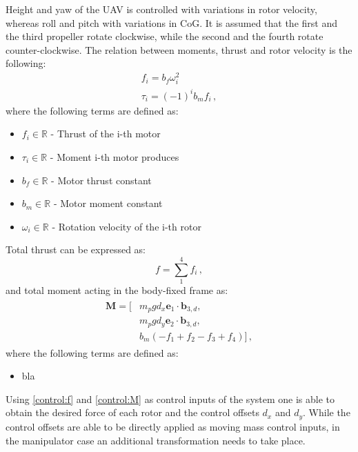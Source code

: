 \indent Height and yaw of the UAV is controlled with variations in rotor velocity, whereas roll and pitch with variations in CoG. It is assumed that the first and the third propeller rotate clockwise, while the second and the fourth rotate counter-clockwise. The relation between moments, thrust and rotor velocity is the following:
\begin{gather}
	f_i = b_f \omega_{i}^2 \label{force}\\
	\tau_i = (-1)^i b_m f_i \, ,
\end{gather}
where the following terms are defined as:
\begin{itemize}
	\item $f_i \in \mathbb{R}$ - Thrust of the i-th motor
	
	\item $\tau_i \in \mathbb{R}$ - Moment i-th motor produces
	
	\item $b_f \in \mathbb{R}$ - Motor thrust constant
	
	\item $b_m \in \mathbb{R}$ - Motor moment constant
	
	\item $\omega_i \in \mathbb{R}$ - Rotation velocity of the i-th rotor
\end{itemize}
Total thrust can be expressed as:
\begin{equation}
	f = \sum_{1}^{4}f_i \, , \label{control:f}
\end{equation}
and total moment acting in the body-fixed frame as:
\begin{align}
	\begin{split} \label{control:M}
	\textbf{M} = [&m_{p}gd_x  \textbf{e}_1 \cdot \textbf{b}_{3,d} , \\
	&m_{p}gd_y \textbf{e}_2 \cdot \textbf{b}_{3,d}, \\
	&b_m(-f_1 + f_2 - f_3 + f_4)] \, ,
	\end{split}
\end{align}
where the following terms are defined as:
\begin{itemize}
	\item bla
\end{itemize}
Using \eqref{control:f} and \eqref{control:M} as control inputs of the system one is able to obtain the desired force of each rotor and the control offsets $d_x$ and $d_y$. While the control offsets are able to be directly applied as moving mass control inputs, in the manipulator case an additional transformation needs to take place. \\
